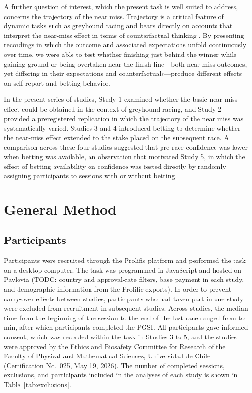\documentclass[man,floatsintext,donotrepeattitle]{apa7}
\begin{document}
A further question of interest, which the present task is well suited to address, concerns the trajectory of the near miss. Trajectory is a critical feature of dynamic tasks such as greyhound racing and bears directly on accounts that interpret the near-miss effect in terms of counterfactual thinking \parencite{medvec1995, wohlenzle2003, wu2017}. By presenting recordings in which the outcome and associated expectations unfold continuously over time, we were able to test whether finishing just behind the winner while gaining ground or being overtaken near the finish line---both near-miss outcomes, yet differing in their expectations and counterfactuals---produce different effects on self-report and betting behavior.

In the present series of studies, Study 1 examined whether the basic near-miss effect could be obtained in the context of greyhound racing, and Study 2 provided a preregistered replication in which the trajectory of the near miss was systematically varied. Studies 3 and 4 introduced betting to determine whether the near-miss effect extended to the stake placed on the subsequent race. A comparison across these four studies suggested that pre-race confidence was lower when betting was available, an observation that motivated Study 5, in which the effect of betting availability on confidence was tested directly by randomly assigning participants to sessions with or without betting.

\section{General Method}

\subsection{Participants}
Participants were recruited through the Prolific platform and performed the task on a desktop computer. The task was programmed in JavaScript and hosted on Pavlovia (TODO: country and approval-rate filters, base payment in each study, and demographic information from the Prolific exports). In order to prevent carry-over effects between studies, participants who had taken part in one study were excluded from recruitment in subsequent studies. Across studies, the median time from the beginning of the session to the end of the last race ranged from  to  min, after which participants completed the PGSI. All participants gave informed consent, which was recorded within the task in Studies 3 to 5, and the studies were approved by the Ethics and Biosafety Committee for Research of the Faculty of Physical and Mathematical Sciences, Universidad de Chile (Certification No.~025, May 19, 2026). The number of completed sessions, exclusions, and participants included in the analyses of each study is shown in Table~\ref{tab:exclusions}.
\end{document}
